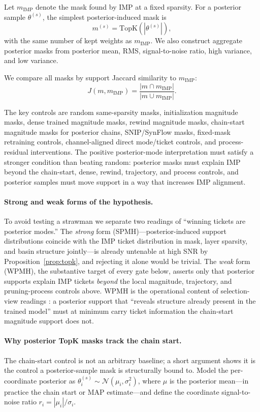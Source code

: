 \documentclass{article}
\begin{document}
Let $m_{\mathrm{IMP}}$ denote the mask found by IMP at a fixed sparsity. For a
posterior sample $\theta^{(s)}$, the simplest posterior-induced mask is
\[
  m^{(s)} = \mathrm{TopK}(|\theta^{(s)}|),
\]
with the same number of kept weights as $m_{\mathrm{IMP}}$. We also construct
aggregate posterior masks from posterior mean, RMS, signal-to-noise ratio, high
variance, and low variance.

We compare all masks by support Jaccard similarity to $m_{\mathrm{IMP}}$:
\[
  J(m, m_{\mathrm{IMP}}) =
  \frac{|m \cap m_{\mathrm{IMP}}|}{|m \cup m_{\mathrm{IMP}}|}.
\]

The key controls are random same-sparsity masks, initialization magnitude
masks, dense trained magnitude masks, rewind magnitude masks, chain-start
magnitude masks for posterior chains, SNIP/SynFlow masks, fixed-mask retraining
controls, channel-aligned direct mode/ticket controls, and process-residual
interventions. The positive posterior-mode interpretation must satisfy a
stronger condition than beating random: posterior masks must explain IMP beyond
the chain-start, dense, rewind, trajectory, and process controls, and posterior
samples must move support in a way that increases IMP alignment.

\paragraph{Strong and weak forms of the hypothesis.}
To avoid testing a strawman we separate two readings of ``winning tickets
are posterior modes.'' The \emph{strong} form (SPMH)---posterior-induced
support distributions coincide with the IMP ticket distribution in mask,
layer sparsity, and basin structure jointly---is already untenable at high
SNR by Proposition~\ref{prop:topk}, and rejecting it alone would be
trivial. The \emph{weak} form (WPMH), the substantive target of every gate
below, asserts only that posterior supports explain IMP tickets
\emph{beyond} the local magnitude, trajectory, and pruning-process controls
above. WPMH is the operational content of selection-view readings
\citep{ramanujan2020hidden, wilson2020bayesian}: a posterior support that
``reveals structure already present in the trained model'' must at minimum
carry ticket information the chain-start magnitude support does not.

\paragraph{Why posterior TopK masks track the chain start.}
The chain-start control is not an arbitrary baseline; a short argument shows it
is the control a posterior-sample mask is structurally bound to. Model the
per-coordinate posterior as $\theta^{(s)}_i \sim \mathcal{N}(\mu_i,
\sigma_i^2)$, where $\mu$ is the posterior mean---in practice the chain start or
MAP estimate---and define the coordinate signal-to-noise ratio $r_i =
|\mu_i|/\sigma_i$.
\end{document}
